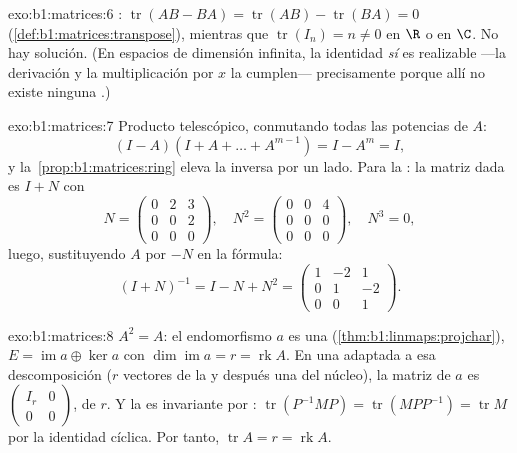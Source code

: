 \begin{solution}{exo:b1:matrices:6}
: $\operatorname{tr}(AB - BA) = \operatorname{tr}(AB) -
\operatorname{tr}(BA) = 0$ (\cref{def:b1:matrices:transpose}),
mientras que $\operatorname{tr}(I_n) = n \neq 0$ en $\R$ o en $\C$.
No hay solución. (En espacios de dimensión infinita, la identidad
\emph{sí} es realizable ---la derivación y la multiplicación por $x$
la cumplen--- precisamente porque allí no existe ninguna .)
\end{solution}

\begin{solution}{exo:b1:matrices:7}
Producto telescópico, conmutando todas las potencias de $A$:
\[
(I - A)(I + A + \dots + A^{m-1}) = I - A^m = I ,
\]
y la~\cref{prop:b1:matrices:ring} eleva la inversa por un lado. Para
la : la matriz dada es $I + N$ con
\[
N = \begin{pmatrix} 0 & 2 & 3\\ 0 & 0 & 2\\ 0&0&0 \end{pmatrix},
\quad
N^2 = \begin{pmatrix} 0&0&4\\ 0&0&0\\ 0&0&0\end{pmatrix},
\quad N^3 = 0 ,
\]
luego, sustituyendo $A$ por $-N$ en la fórmula:
\[
(I + N)^{-1} = I - N + N^2 =
\begin{pmatrix}
1 & -2 & 1\\
0 & 1 & -2\\
0 & 0 & 1
\end{pmatrix}.
\]
\end{solution}

\begin{solution}{exo:b1:matrices:8}
$A^2 = A$: el endomorfismo $a$ es una 
(\cref{thm:b1:linmaps:projchar}),
$E = \operatorname{im} a \oplus \ker a$ con
$\dim\operatorname{im} a = r = \operatorname{rk} A$. En una 
adaptada a esa descomposición ($r$ vectores de la  y después
una  del núcleo), la matriz de $a$ es
$\begin{pmatrix} I_r & 0\\ 0 & 0\end{pmatrix}$, de  $r$. Y la
 es invariante por :
$\operatorname{tr}(P^{-1}MP) = \operatorname{tr}(MPP^{-1}) =
\operatorname{tr} M$ por la identidad cíclica. Por tanto,
$\operatorname{tr} A = r = \operatorname{rk} A$.
\end{solution}

